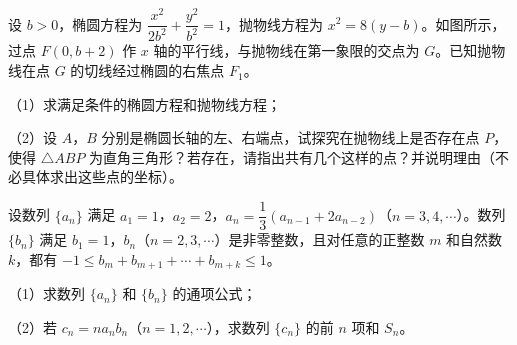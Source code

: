 \endgroup
\begin{question}
设 $b>0$，椭圆方程为 $\dfrac{x^2}{2b^2}+\dfrac{y^2}{b^2}=1$，抛物线方程为 $x^2=8(y-b)$。如图所示，过点 $F(0,b+2)$ 作 $x$ 轴的平行线，与抛物线在第一象限的交点为 $G$。已知抛物线在点 $G$ 的切线经过椭圆的右焦点 $F_1$。

（1）求满足条件的椭圆方程和抛物线方程；

（2）设 $A$，$B$ 分别是椭圆长轴的左、右端点，试探究在抛物线上是否存在点 $P$，使得 $\triangle ABP$ 为直角三角形？若存在，请指出共有几个这样的点？并说明理由（不必具体求出这些点的坐标）。
\nopagebreak[4]
\begin{center}\end{center}
\nopagebreak[4]
\end{question}
\begin{question}
设数列 $\{a_n\}$ 满足 $a_1=1$，$a_2=2$，$a_n=\dfrac13\left(a_{n-1}+2a_{n-2}\right)$（$n=3,4,\cdots$）。数列 $\{b_n\}$ 满足 $b_1=1$，$b_n$（$n=2,3,\cdots$）是非零整数，且对任意的正整数 $m$ 和自然数 $k$，都有 $-1\leqslant b_m+b_{m+1}+\cdots+b_{m+k}\leqslant1$。

（1）求数列 $\{a_n\}$ 和 $\{b_n\}$ 的通项公式；

（2）若 $c_n=na_nb_n$（$n=1,2,\cdots$），求数列 $\{c_n\}$ 的前 $n$ 项和 $S_n$。

\end{question}